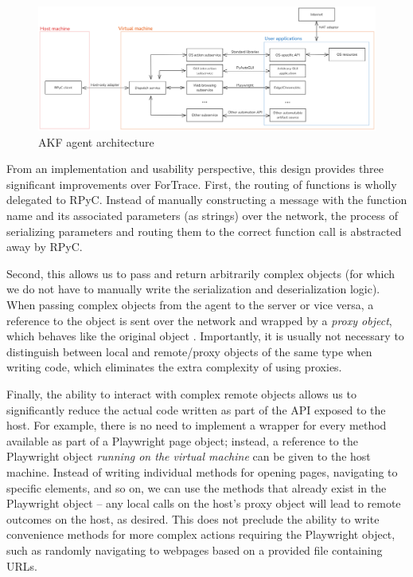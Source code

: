 \documentclass[final,5p,times,twocolumn]{elsarticle}
\begin{document}
\begin{figure}[htbp]
\centering
\includegraphics[width=1\linewidth]{agent-modular.png}
\caption{AKF agent architecture}\label{fig:agent-modular}
\end{figure}

From an implementation and usability perspective, this design provides
three significant improvements over ForTrace. First, the routing of
functions is wholly delegated to RPyC. Instead of manually constructing
a message with the function name and its associated parameters (as
strings) over the network, the process of serializing parameters and
routing them to the correct function call is abstracted away by RPyC.

Second, this allows us to pass and return arbitrarily complex objects
(for which we do not have to manually write the serialization and
deserialization logic). When passing complex objects from the agent to
the server or vice versa, a reference to the object is sent over the
network and wrapped by a \emph{proxy object}, which behaves like the
original object \citep{TheoryOperationRPyC}. Importantly, it is
usually not necessary to distinguish between local and remote/proxy
objects of the same type when writing code, which eliminates the extra
complexity of using proxies.

Finally, the ability to interact with complex remote objects allows us
to significantly reduce the actual code written as part of the API
exposed to the host. For example, there is no need to implement a
wrapper for every method available as part of a Playwright page object;
instead, a reference to the Playwright object \emph{running on the
virtual machine} can be given to the host machine. Instead of writing
individual methods for opening pages, navigating to specific elements,
and so on, we can use the methods that already exist in the Playwright
object -- any local calls on the host's proxy object will lead to remote
outcomes on the host, as desired. This does not preclude the ability to
write convenience methods for more complex actions requiring the
Playwright object, such as randomly navigating to webpages based on a
provided file containing URLs.
\end{document}
